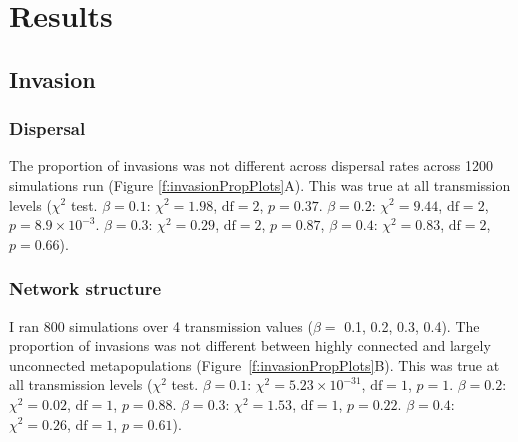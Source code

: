 \section{Results}









































\subsection{Invasion}


\subsubsection{Dispersal}


The proportion of invasions was not different across dispersal rates across 1200 simulations run (Figure \ref{f:invasionPropPlots}A).
This was true at all transmission levels ($\chi^2$ test. $\beta = 0.1$: $\chi^2 = 1.98$, $\text{df} = 2$, $p = 0.37$. $\beta = 0.2$: $\chi^2 = 9.44$, $\text{df} = 2$, $p = \ensuremath{8.9\times 10^{-3}}$. $\beta = 0.3$: $\chi^2 = 0.29$, $\text{df} = 2$, $p = 0.87$, $\beta = 0.4$: $\chi^2 = 0.83$, $\text{df} = 2$, $p = 0.66$).


\subsubsection{Network structure}

I ran 800 simulations over 4 transmission values ($\beta = $ 0.1, 0.2, 0.3, 0.4).
The proportion of invasions was not different between highly connected and largely unconnected metapopulations (Figure~\ref{f:invasionPropPlots}B). 
This was true at all transmission levels ($\chi^2$ test. $\beta = 0.1$: $\chi^2 = \ensuremath{5.23\times 10^{-31}}$, $\text{df} = 1$, $p = 1$. $\beta = 0.2$: $\chi^2 = 0.02$, $\text{df} = 1$, $p = 0.88$. $\beta = 0.3$: $\chi^2 = 1.53$, $\text{df} = 1$, $p = 0.22$. $\beta = 0.4$: $\chi^2 = 0.26$, $\text{df} = 1$, $p = 0.61$).

